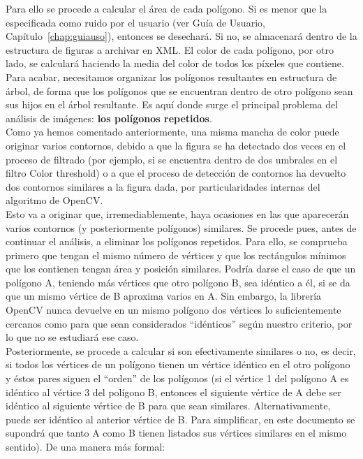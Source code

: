 {	Para ello se procede a calcular el área de cada polígono. Si es menor que la especificada como ruido por el usuario (ver Guía de Usuario, Capítulo~\ref{chap:guiauso}), entonces se desechará. Si no, se almacenará dentro de la estructura de figuras a archivar en XML. El color de cada polígono, por otro lado, se calculará haciendo la media del color de todos los píxeles que contiene.\\
	
	Para acabar, necesitamos organizar los polígonos resultantes en estructura de árbol, de forma que los polígonos que se encuentran dentro de otro polígono sean sus hijos en el árbol resultante. Es aquí donde surge el principal problema del análisis de imágenes: \textbf{los polígonos repetidos}.\\
	
	Como ya hemos comentado anteriormente, una misma mancha de color puede originar varios contornos, debido a que la figura se ha detectado dos veces en el proceso de filtrado (por ejemplo, si se encuentra dentro de dos umbrales en el filtro Color threshold) o a que el proceso de detección de contornos ha devuelto dos contornos similares a la figura dada, por particularidades internas del algoritmo de OpenCV.\\
	
	Esto va a originar que, irremediablemente, haya ocasiones en las que aparecerán varios contornos (y posteriormente polígonos) similares. Se procede pues, antes de continuar el análisis, a eliminar los polígonos repetidos. Para ello, se comprueba primero que tengan el mismo número de vértices y que los rectángulos mínimos que los contienen tengan área y posición similares. \color{blue}Podría darse el caso de que un polígono A, teniendo más vértices que otro polígono B, sea idéntico a él, si se da que un mismo vértice de B aproxima varios en A. Sin embargo, la librería OpenCV nunca devuelve en un mismo polígono dos vértices lo suficientemente cercanos como para que sean considerados ``idénticos'' según nuestro criterio, por lo que no se estudiará ese caso.\\

	Posteriormente, se procede a calcular si son efectivamente similares o no, es decir, si todos los vértices de un polígono tienen un vértice idéntico en el otro polígono y éstos pares siguen el ``orden'' de los polígonos (si el vértice 1 del polígono A es idéntico al vértice 3 del polígono B, entonces el siguiente vértice de A debe ser idéntico al siguiente vértice de B para que sean similares. Alternativamente, puede ser idéntico al anterior vértice de B. Para simplificar, en este documento se supondrá que tanto A como B tienen listados sus vértices similares en el mismo sentido). De una manera más formal:\color{black}
	
}
